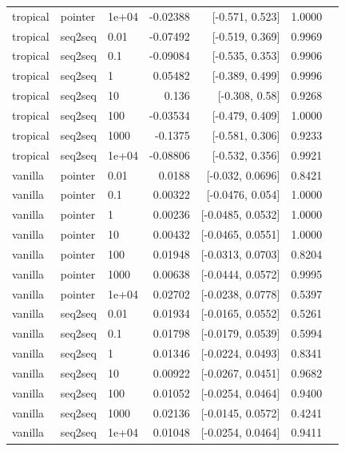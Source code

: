 \documentclass[10pt]{article}
\begin{document}
{\begin{longtable}{lllrrrl}
tropical & pointer & 1e+04 & -0.02388 & [-0.571, 0.523] & 1.0000 & \\
tropical & seq2seq & 0.01 & -0.07492 & [-0.519, 0.369] & 0.9969 & \\
tropical & seq2seq & 0.1 & -0.09084 & [-0.535, 0.353] & 0.9906 & \\
tropical & seq2seq & 1 & 0.05482 & [-0.389, 0.499] & 0.9996 & \\
tropical & seq2seq & 10 & 0.136 & [-0.308, 0.58] & 0.9268 & \\
tropical & seq2seq & 100 & -0.03534 & [-0.479, 0.409] & 1.0000 & \\
tropical & seq2seq & 1000 & -0.1375 & [-0.581, 0.306] & 0.9233 & \\
tropical & seq2seq & 1e+04 & -0.08806 & [-0.532, 0.356] & 0.9921 & \\
vanilla & pointer & 0.01 & 0.0188 & [-0.032, 0.0696] & 0.8421 & \\
vanilla & pointer & 0.1 & 0.00322 & [-0.0476, 0.054] & 1.0000 & \\
vanilla & pointer & 1 & 0.00236 & [-0.0485, 0.0532] & 1.0000 & \\
vanilla & pointer & 10 & 0.00432 & [-0.0465, 0.0551] & 1.0000 & \\
vanilla & pointer & 100 & 0.01948 & [-0.0313, 0.0703] & 0.8204 & \\
vanilla & pointer & 1000 & 0.00638 & [-0.0444, 0.0572] & 0.9995 & \\
vanilla & pointer & 1e+04 & 0.02702 & [-0.0238, 0.0778] & 0.5397 & \\
vanilla & seq2seq & 0.01 & 0.01934 & [-0.0165, 0.0552] & 0.5261 & \\
vanilla & seq2seq & 0.1 & 0.01798 & [-0.0179, 0.0539] & 0.5994 & \\
vanilla & seq2seq & 1 & 0.01346 & [-0.0224, 0.0493] & 0.8341 & \\
vanilla & seq2seq & 10 & 0.00922 & [-0.0267, 0.0451] & 0.9682 & \\
vanilla & seq2seq & 100 & 0.01052 & [-0.0254, 0.0464] & 0.9400 & \\
vanilla & seq2seq & 1000 & 0.02136 & [-0.0145, 0.0572] & 0.4241 & \\
vanilla & seq2seq & 1e+04 & 0.01048 & [-0.0254, 0.0464] & 0.9411 & \\
\bottomrule
\end{longtable}
}
\end{document}

